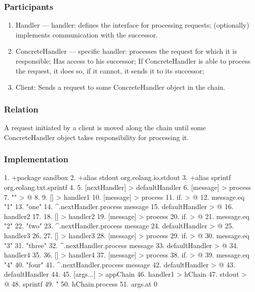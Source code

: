 \documentclass[12pt]{book}
\begin{document}
\subsubsection{Participants}
\begin{enumerate}
    \item Handler —  handler: defines the interface for processing requests; (optionally) implements communication with the successor.
    \item ConcreteHandler — specific handler: processes the request for which it is responsible; Has access to his successor; If ConcreteHandler  is able to process the request, it does so, if it cannot, it sends it to its successor;
    \item Client: Sends a request to some ConcreteHandler object in the chain.
\end{enumerate}

\subsubsection{Relation}
A request initiated by a client is moved along the chain until some ConcreteHandler object takes responsibility for processing it.

\subsubsection{Implementation}
\begin{ffcode}
1.	+package sandbox
2.	+alias stdout org.eolang.io.stdout
3.	+alias sprintf org.eolang.txt.sprintf
4.	
5.	[nextHandler] > defaultHandler
6.	  [message] > process
7.	    "" > @
8.	
9.	[] > handler1
10.	  [message] > process
11.	    if. > @
12.	      message.eq "1"
13.	      "one"
14.	      ^.nextHandler.process message
15.	  defaultHandler > @
16.	    handler2
17.	
18.	[] > handler2
19.	  [message] > process
20.	    if. > @
21.	      message.eq "2"
22.	      "two"
23.	      ^.nextHandler.process message
24.	  defaultHandler > @
25.	    handler3
26.	
27.	[] > handler3
28.	  [message] > process
29.	    if. > @
30.	      message.eq "3"
31.	      "three"
32.	      ^.nextHandler.process message
33.	  defaultHandler > @
34.	    handler4
35.	
36.	[] > handler4
37.	  [message] > process
38.	    if. > @
39.	      message.eq "4"
40.	      "four"
41.	      ^.nextHandler.process message
42.	  defaultHandler > @
43.	    defaultHandler
44.	
45.	[args...] > appChain
46.	  handler1 > hChain
47.	  stdout > @
48.	    sprintf
49.	      "%
50.	      hChain.process
51.	        args.at 0 

\end{ffcode}
\end{document}

